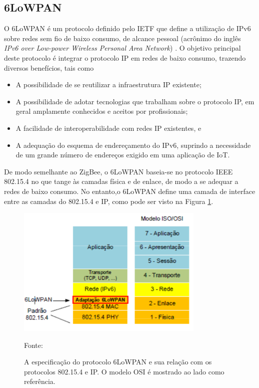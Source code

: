 \subsection{6LoWPAN}
O 6LoWPAN é um protocolo definido pelo IETF que define a utilização de IPv6 sobre redes sem fio de baixo consumo, de alcance pessoal (acrônimo do inglês \textit{IPv6 over Low-power Wireless Personal Area Network}) \cite{rfc4944}. O objetivo principal deste protocolo é integrar o protocolo IP em redes de baixo consumo, trazendo diversos benefícios, tais como \cite{rfc4919, schonwalder2010}
\begin{itemize}
	\item A possibilidade de se reutilizar a infraestrutura IP existente;
	\item A possibilidade de adotar tecnologias que trabalham sobre o protocolo IP, em geral amplamente conhecidos e aceitos por profissionais;
	\item A facilidade de interoperabilidade com redes IP existentes, e
	\item A adequação do esquema de endereçamento do IPv6, suprindo a necessidade de um grande número de endereços exigido em uma aplicação de IoT.
\end{itemize}

De modo semelhante ao ZigBee, o 6LoWPAN baseia-se no protocolo IEEE 802.15.4 no que tange às camadas física e de enlace, de modo a se adequar a redes de baixo consumo. No entanto,o 6LoWPAN define uma camada de interface entre as camadas do 802.15.4 e IP, como pode ser visto na Figura \ref{fig:6lowpan}.

\begin{figure}[h]
	\centering
	\caption{A especificação do protocolo 6LoWPAN e sua relação com os protocolos 802.15.4 e IP. O modelo OSI é mostrado ao lado como referência.}
  \includegraphics[width=0.8\textwidth]{imagens/6lowpan.png}
  \label{fig:6lowpan}
  
  Fonte: \cite{moreiras2009}
\end{figure}

